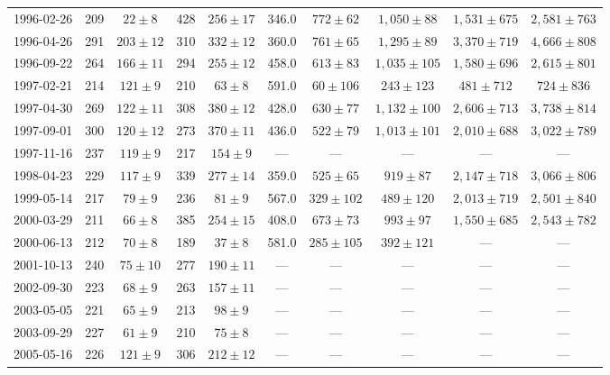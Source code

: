 \begin{landscape}
\begin{longtable}{cccccccccc}
{1996-02-26} & 209 & {$22  \pm  8$} & 428 & {$256 \pm 17$} & 346.0 & {$772 \pm 62$} & {$1,050 \pm 88$} & {$1,531 \pm 675$} & {$2,581 \pm 763$} \\
{1996-04-26} & 291 & {$203  \pm  12$} & 310 & {$332 \pm 12$} & 360.0 & {$761 \pm 65$} & {$1,295 \pm 89$} & {$3,370 \pm 719$} & {$4,666 \pm 808$} \\
{1996-09-22} & 264 & {$166  \pm  11$} & 294 & {$255 \pm 12$} & 458.0 & {$613 \pm 83$} & {$1,035 \pm 105$} & {$1,580 \pm 696$} & {$2,615 \pm 801$} \\
{1997-02-21} & 214 & {$121  \pm  9$} & 210 & {$63 \pm 8$} & 591.0 & {$60 \pm 106$} & {$243 \pm 123$} & {$481 \pm 712$} & {$724 \pm 836$} \\
{1997-04-30} & 269 & {$122  \pm  11$} & 308 & {$380 \pm 12$} & 428.0 & {$630 \pm 77$} & {$1,132 \pm 100$} & {$2,606 \pm 713$} & {$3,738 \pm 814$} \\
{1997-09-01} & 300 & {$120  \pm  12$} & 273 & {$370 \pm 11$} & 436.0 & {$522 \pm 79$} & {$1,013 \pm 101$} & {$2,010 \pm 688$} & {$3,022 \pm 789$} \\
{1997-11-16} & 237 & {$119  \pm  9$} & 217 & {$154 \pm 9$} & --- & --- & --- & --- & --- \\
{1998-04-23} & 229 & {$117  \pm  9$} & 339 & {$277 \pm 14$} & 359.0 & {$525 \pm 65$} & {$919 \pm 87$} & {$2,147 \pm 718$} & {$3,066 \pm 806$} \\
{1999-05-14} & 217 & {$79  \pm  9$} & 236 & {$81 \pm 9$} & 567.0 & {$329 \pm 102$} & {$489 \pm 120$} & {$2,013 \pm 719$} & {$2,501 \pm 840$} \\
{2000-03-29} & 211 & {$66  \pm  8$} & 385 & {$254 \pm 15$} & 408.0 & {$673 \pm 73$} & {$993 \pm 97$} & {$1,550 \pm 685$} & {$2,543 \pm 782$} \\
{2000-06-13} & 212 & {$70  \pm  8$} & 189 & {$37 \pm 8$} & 581.0 & {$285 \pm 105$} & {$392 \pm 121$} & --- & --- \\
{2001-10-13} & 240 & {$75  \pm  10$} & 277 & {$190 \pm 11$} & --- & --- & --- & --- & --- \\
{2002-09-30} & 223 & {$68  \pm  9$} & 263 & {$157 \pm 11$} & --- & --- & --- & --- & --- \\
{2003-05-05} & 221 & {$65  \pm  9$} & 213 & {$98 \pm 9$} & --- & --- & --- & --- & --- \\
{2003-09-29} & 227 & {$61  \pm  9$} & 210 & {$75 \pm 8$} & --- & --- & --- & --- & --- \\
{2005-05-16} & 226 & {$121  \pm  9$} & 306 & {$212 \pm 12$} & --- & --- & --- & --- & --- \\

\end{longtable}
\end{landscape}
